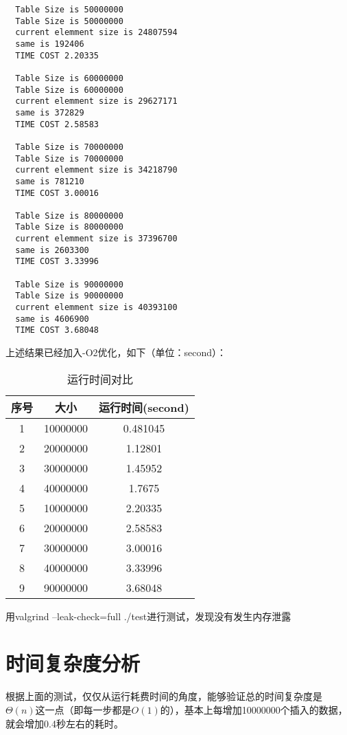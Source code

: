 \documentclass[UTF8]{ctexart}
\begin{document}
\begin{verbatim}
  Table Size is 50000000
  Table Size is 50000000
  current elemment size is 24807594
  same is 192406
  TIME COST 2.20335

  Table Size is 60000000
  Table Size is 60000000
  current elemment size is 29627171
  same is 372829
  TIME COST 2.58583

  Table Size is 70000000
  Table Size is 70000000
  current elemment size is 34218790
  same is 781210
  TIME COST 3.00016

  Table Size is 80000000
  Table Size is 80000000
  current elemment size is 37396700
  same is 2603300
  TIME COST 3.33996

  Table Size is 90000000
  Table Size is 90000000
  current elemment size is 40393100
  same is 4606900
  TIME COST 3.68048
\end{verbatim}

上述结果已经加入-O2优化，如下（单位：second）：

\begin{table}[H]
  \begin{center}
  \caption{运行时间对比}
  \begin{tabular}{c|c|c}
  \label{table1}
  \textbf{序号} & \textbf{大小} & \textbf{运行时间(second)}\\
  \hline
  1 & 10000000 & 0.481045\\
  2 & 20000000 & 1.12801\\
  3 & 30000000 & 1.45952\\
  4 & 40000000 & 1.7675 \\
  5 & 10000000 & 2.20335\\
  6 & 20000000 & 2.58583\\
  7 & 30000000 & 3.00016\\
  8 & 40000000 & 3.33996 \\
  9 & 90000000 & 3.68048
  \end{tabular}
  \end{center}
\end{table}

\begin{center}
\end{center}

用valgrind --leak-check=full ./test进行测试，发现没有发生内存泄露 \

\section{时间复杂度分析}

根据上面的测试，仅仅从运行耗费时间的角度，能够验证总的时间复杂度是$\Theta(n)$这一点（即每一步都是$O(1)$的），基本上每增加10000000个插入的数据，就会增加0.4秒左右的耗时。
\end{document}
